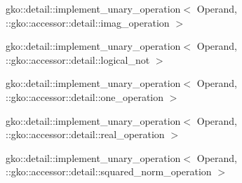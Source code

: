 \begin{DoxyCompactList}
\begin{DoxyCompactList}
\item {}
\end{DoxyCompactList}
\item gko\+:\+:detail\+:\+:implement\+\_\+unary\+\_\+operation$<$ Operand, \+:\+:gko\+:\+:accessor\+:\+:detail\+:\+:imag\+\_\+operation $>$\begin{DoxyCompactList}
\item {}
\end{DoxyCompactList}
\item gko\+:\+:detail\+:\+:implement\+\_\+unary\+\_\+operation$<$ Operand, \+:\+:gko\+:\+:accessor\+:\+:detail\+:\+:logical\+\_\+not $>$\begin{DoxyCompactList}
\item {}
\end{DoxyCompactList}
\item gko\+:\+:detail\+:\+:implement\+\_\+unary\+\_\+operation$<$ Operand, \+:\+:gko\+:\+:accessor\+:\+:detail\+:\+:one\+\_\+operation $>$\begin{DoxyCompactList}
\item {}
\end{DoxyCompactList}
\item gko\+:\+:detail\+:\+:implement\+\_\+unary\+\_\+operation$<$ Operand, \+:\+:gko\+:\+:accessor\+:\+:detail\+:\+:real\+\_\+operation $>$\begin{DoxyCompactList}
\item {}
\end{DoxyCompactList}
\item gko\+:\+:detail\+:\+:implement\+\_\+unary\+\_\+operation$<$ Operand, \+:\+:gko\+:\+:accessor\+:\+:detail\+:\+:squared\+\_\+norm\+\_\+operation $>$\begin{DoxyCompactList}
\item {}

\end{DoxyCompactList}
\end{DoxyCompactList}
